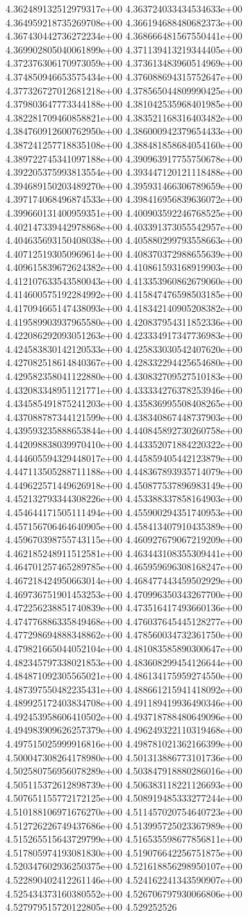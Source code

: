 4.362489132512979317e+00	4.363724033434534633e+00	4.364959218735269708e+00	4.366194688480682373e+00	4.367430442736272234e+00	4.368666481567550441e+00	4.369902805040061899e+00	4.371139413219344405e+00	4.372376306170973059e+00	4.373613483960514969e+00	4.374850946653575434e+00	4.376088694315752647e+00	4.377326727012681218e+00	4.378565044809990425e+00	4.379803647773344188e+00	4.381042535968401985e+00	4.382281709460858821e+00	4.383521168316403482e+00	4.384760912600762950e+00	4.386000942379654433e+00	4.387241257718835108e+00	4.388481858684054160e+00	4.389722745341097188e+00	4.390963917755750678e+00	4.392205375993813554e+00	4.393447120121118488e+00	4.394689150203489270e+00	4.395931466306789659e+00	4.397174068496874533e+00	4.398416956839636072e+00	4.399660131400959351e+00	4.400903592246768525e+00	4.402147339442978868e+00	4.403391373055542957e+00	4.404635693150408038e+00	4.405880299793558663e+00	4.407125193050969614e+00	4.408370372988655639e+00	4.409615839672624382e+00	4.410861593168919903e+00	4.412107633543580043e+00	4.413353960862679060e+00	4.414600575192284992e+00	4.415847476598503185e+00	4.417094665147438093e+00	4.418342140905208382e+00	4.419589903937965580e+00	4.420837954311852336e+00	4.422086292093051263e+00	4.423334917347736983e+00	4.424583830142120533e+00	4.425833030542407620e+00	4.427082518614840367e+00	4.428332294425654680e+00	4.429582358041122880e+00	4.430832709527510183e+00	4.432083348951121771e+00	4.433334276378253946e+00	4.434585491875241203e+00	4.435836995508408265e+00	4.437088787344121599e+00	4.438340867448737903e+00	4.439593235888653844e+00	4.440845892730260758e+00	4.442098838039970410e+00	4.443352071884220322e+00	4.444605594329448017e+00	4.445859405442123879e+00	4.447113505288711188e+00	4.448367893935714079e+00	4.449622571449626918e+00	4.450877537896983149e+00	4.452132793344308226e+00	4.453388337858164903e+00	4.454644171505111494e+00	4.455900294351740953e+00	4.457156706464640905e+00	4.458413407910435389e+00	4.459670398755743115e+00	4.460927679067219209e+00	4.462185248911512581e+00	4.463443108355309441e+00	4.464701257465289785e+00	4.465959696308168247e+00	4.467218424950663014e+00	4.468477443459502929e+00	4.469736751901453253e+00	4.470996350343267700e+00	4.472256238851740839e+00	4.473516417493660136e+00	4.474776886335849468e+00	4.476037645445128277e+00	4.477298694888348862e+00	4.478560034732361750e+00	4.479821665044052104e+00	4.481083585890300647e+00	4.482345797338021853e+00	4.483608299454126644e+00	4.484871092305565021e+00	4.486134175959274550e+00	4.487397550482235431e+00	4.488661215941418092e+00	4.489925172403834708e+00	4.491189419936490346e+00	4.492453958606410502e+00	4.493718788480649096e+00	4.494983909626257379e+00	4.496249322110319468e+00	4.497515025999916816e+00	4.498781021362166399e+00	4.500047308264178980e+00	4.501313886773101736e+00	4.502580756956078289e+00	4.503847918880286016e+00	4.505115372612898739e+00	4.506383118221126693e+00	4.507651155772172125e+00	4.508919485333277244e+00	4.510188106971676270e+00	4.511457020754640723e+00	4.512726226749437686e+00	4.513995725023367989e+00	4.515265515643729799e+00	4.516535598677856811e+00	4.517805974193081830e+00	4.519076642256751875e+00	4.520347602936250375e+00	4.521618856298950107e+00	4.522890402412261146e+00	4.524162241343590907e+00	4.525434373160380552e+00	4.526706797930066806e+00	4.527979515720122805e+00	4.529252526